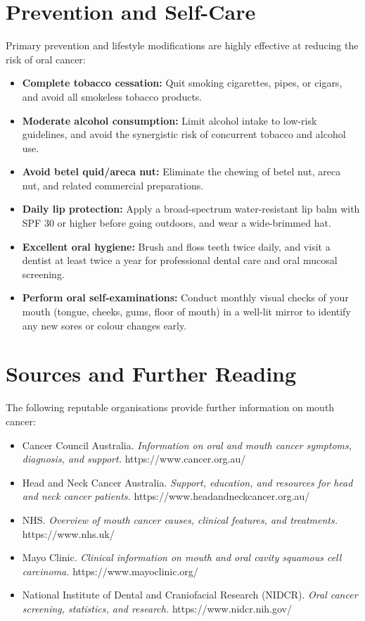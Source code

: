 \section*{Prevention and Self-Care}
Primary prevention and lifestyle modifications are highly effective at reducing the risk of oral cancer:
\begin{itemize}
    \item \textbf{Complete tobacco cessation:} Quit smoking cigarettes, pipes, or cigars, and avoid all smokeless tobacco products.
    \item \textbf{Moderate alcohol consumption:} Limit alcohol intake to low-risk guidelines, and avoid the synergistic risk of concurrent tobacco and alcohol use.
    \item \textbf{Avoid betel quid/areca nut:} Eliminate the chewing of betel nut, areca nut, and related commercial preparations.
    \item \textbf{Daily lip protection:} Apply a broad-spectrum water-resistant lip balm with SPF 30 or higher before going outdoors, and wear a wide-brimmed hat.
    \item \textbf{Excellent oral hygiene:} Brush and floss teeth twice daily, and visit a dentist at least twice a year for professional dental care and oral mucosal screening.
    \item \textbf{Perform oral self-examinations:} Conduct monthly visual checks of your mouth (tongue, cheeks, gums, floor of mouth) in a well-lit mirror to identify any new sores or colour changes early.
\end{itemize}

\section*{Sources and Further Reading}
The following reputable organisations provide further information on mouth cancer:
\begin{itemize}
    \item Cancer Council Australia. \textit{Information on oral and mouth cancer symptoms, diagnosis, and support.} https://www.cancer.org.au/
    \item Head and Neck Cancer Australia. \textit{Support, education, and resources for head and neck cancer patients.} https://www.headandneckcancer.org.au/
    \item NHS. \textit{Overview of mouth cancer causes, clinical features, and treatments.} https://www.nhs.uk/
    \item Mayo Clinic. \textit{Clinical information on mouth and oral cavity squamous cell carcinoma.} https://www.mayoclinic.org/
    \item National Institute of Dental and Craniofacial Research (NIDCR). \textit{Oral cancer screening, statistics, and research.} https://www.nidcr.nih.gov/
\end{itemize}
